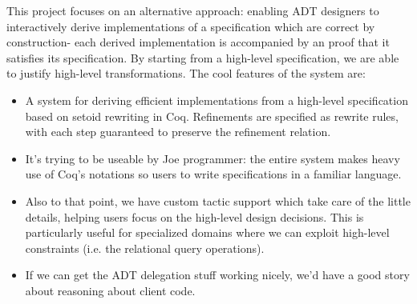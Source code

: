 This project focuses on an alternative approach: enabling ADT
designers to interactively derive implementations of a specification
which are correct by construction- each derived implementation is
accompanied by an proof that it satisfies its specification. By
starting from a high-level specification, we are able to justify
high-level transformations. The cool features of the system are:
\begin{itemize}
\item A system for deriving efficient implementations from a
  high-level specification based on setoid rewriting in
  Coq. Refinements are specified as rewrite rules, with each step
  guaranteed to preserve the refinement relation.
\item It's trying to be useable by Joe programmer: the entire system
  makes heavy use of Coq's notations so users to write specifications
  in a familiar language.
\item Also to that point, we have custom tactic support which take
  care of the little details, helping users focus on the high-level
  design decisions. This is particularly useful for specialized
  domains where we can exploit high-level constraints (i.e. the
  relational query operations).
\item If we can get the ADT delegation stuff working nicely, we'd have
  a good story about reasoning about client code.
\end{itemize}
